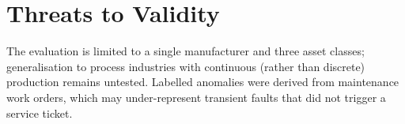\section{Threats to Validity}
The evaluation is limited to a single manufacturer and three asset classes; generalisation to
process industries with continuous (rather than discrete) production remains untested.
Labelled anomalies were derived from maintenance work orders, which may under-represent
transient faults that did not trigger a service ticket.

